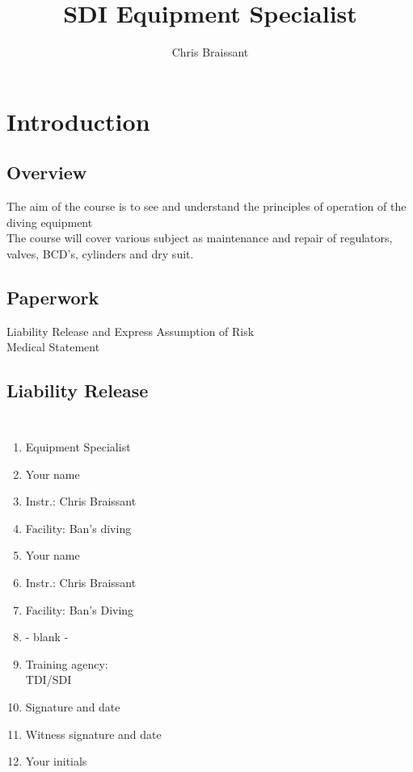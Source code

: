 \documentclass[aspectratio=1610,english,12pt]{beamer}
\author[]{Chris Braissant}
\title[]{SDI Equipment Specialist}
\institute{Ban's Diving Resort}
\begin{document}
\begin{frame}[plain]
	\maketitle
\end{frame}

\section{Introduction}

\subsection{Overview}
\begin{frame}{\insertsubsection}
	The aim of the course is to see and understand the principles of operation of the diving equipment\\
	The course will cover various subject as maintenance and repair of regulators, valves, BCD's, cylinders and dry suit.
\end{frame}

\subsection{Paperwork}
\begin{frame}{\insertsubsection}
	Liability Release and Express Assumption of Risk\\
	Medical Statement
\end{frame}

\subsection{Liability Release}
\begin{frame}{\insertsubsection}
	\begin{columns}[onlytextwidth]
			\begin{enumerate}\itemsep0em 
				\item Equipment Specialist
				\item Your name
				\item Instr.: Chris Braissant
				\item Facility: Ban's diving
				\item Your name
				\item Instr.: Chris Braissant
				\item Facility: Ban's Diving
				\item - blank -
				\item Training agency:\\TDI/SDI
				\item Signature and date
				\item Witness signature and date
				\item Your initials
			\end{enumerate}
	\end{columns}
\end{frame}
\end{document}
